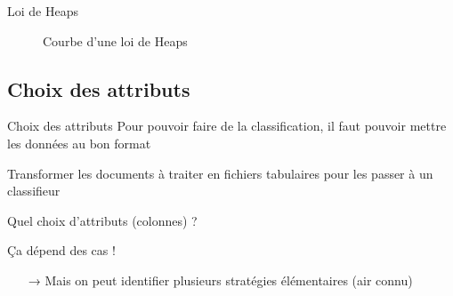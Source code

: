 \documentclass[hyperref={unicode}, xcolor={svgnames}, french]{beamer}
\begin{document}
\begin{frame}[label=heapslawgraph]{Loi de Heaps}
    \begin{figure}
        \tikzset{external/export=true}
        \caption{Courbe d'une loi de Heaps}
    \end{figure}
\end{frame}



\subsection{Choix des attributs}
\begin{frame}{Choix des attributs}
    Pour pouvoir faire de la classification, il faut pouvoir mettre les données au bon format
    \begin{description}[<+->][*]
        \item[Objectif] Transformer les documents à traiter en fichiers tabulaires pour les passer à un classifieur
        \item[Problème] Quel choix d'attributs (colonnes) ?
        \item[Solution] Ça dépend des cas !
            \begin{itemize}
                \item[→] Mais on peut identifier plusieurs stratégies élémentaires (air connu)
            \end{itemize}
    \end{description}
\end{frame}
\end{document}
